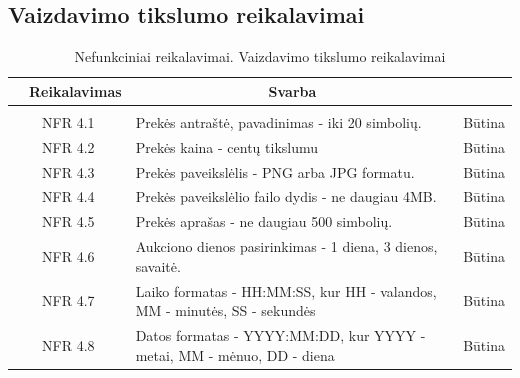 \documentclass{VUMIFPSkursinis}
\begin{document}
	\subsection{Vaizdavimo tikslumo reikalavimai}
	\begin{table}[H]
		\caption{Nefunkciniai reikalavimai. Vaizdavimo tikslumo reikalavimai}
		\begin{tabular}{|p{1cm}|p{1cm}|p{}|p{}|}
			\hline
			\rowcolor{gray!50}
			\multicolumn{2}{|c|}{{\bfseries Kodas}}&
			\multicolumn{1}{c|}{{\bfseries Reikalavimas}}&
			\multicolumn{1}{c|}{{\bfseries Svarba}}\\
			\hline
			\rowcolor{lightgray}
			\multicolumn{4}{|c|}{Vaizdavimo tikslumo reikalvimai}\\
			\hline
			\multicolumn{2}{|c|}{NFR 4.1}&
			{Prekės antraštė, pavadinimas - iki 20 simbolių.}&
			\multicolumn{1}{c|}{Būtina}\\
			\hline
			\multicolumn{2}{|c|}{NFR 4.2}&
			{Prekės kaina - centų tikslumu}&
			\multicolumn{1}{c|}{Būtina}\\
			\hline
			\multicolumn{2}{|c|}{NFR 4.3}&
			{Prekės paveikslėlis - PNG arba JPG formatu.}&
			\multicolumn{1}{c|}{Būtina}\\
			\hline
			\multicolumn{2}{|c|}{NFR 4.4}&
			{Prekės paveikslėlio failo dydis - ne daugiau 4MB.}&
			\multicolumn{1}{c|}{Būtina}\\
			\hline
			\multicolumn{2}{|c|}{NFR 4.5}&
			{Prekės aprašas - ne daugiau 500 simbolių.}&
			\multicolumn{1}{c|}{Būtina}\\
			\hline
			\multicolumn{2}{|c|}{NFR 4.6}&
			{Aukciono dienos pasirinkimas - 1 diena, 3 dienos, savaitė.}&
			\multicolumn{1}{c|}{Būtina}\\
			\hline
			\multicolumn{2}{|c|}{NFR 4.7}&
			{Laiko formatas - HH:MM:SS, kur HH - valandos, MM - minutės, SS - sekundės}&
			\multicolumn{1}{c|}{Būtina}\\
			\hline
			\multicolumn{2}{|c|}{NFR 4.8}&
			{Datos formatas - YYYY:MM:DD, kur YYYY - metai, MM - mėnuo, DD - diena}&
			\multicolumn{1}{c|}{Būtina}\\
			\hline
		\end{tabular}
	\end{table}
\end{document}
